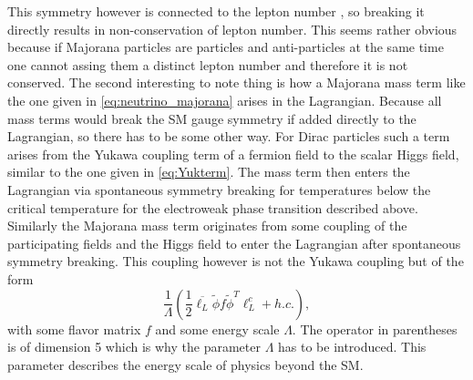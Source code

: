 This symmetry however is connected to the lepton number \cite[p. 14]{Bernreuther:2002uj}, so breaking it directly results in non-conservation of lepton number. This seems rather obvious because if Majorana particles are particles and anti-particles at the same time one cannot assing them a distinct lepton number and therefore it is not conserved. \newline \indent
The second interesting to note thing is how a Majorana mass term like the one given in \eqref{eq:neutrino_majorana} arises in the Lagrangian. Because all mass terms would break the SM gauge symmetry if added directly to the Lagrangian, so there has to be some other way. For Dirac particles such a term arises from the Yukawa coupling term of a fermion field to the scalar Higgs field, similar to the one given in \eqref{eq:Yukterm}. The mass term then enters the Lagrangian via spontaneous symmetry breaking for temperatures below the critical temperature for the electroweak phase transition described above. Similarly the Majorana mass term originates from some coupling of the participating fields and the Higgs field to enter the Lagrangian after spontaneous symmetry breaking. This coupling however is not the Yukawa coupling but of the form \cite[Eq. (5)]{Drewes:2013gca}
\begin{equation}
	\frac{1}{\Lambda}\left(\frac{1}{2}\overline{\ell_L}\tilde{\phi}f\tilde{\phi}^T\ell^c_L+h.c.\right),
\end{equation}
with some flavor matrix $f$ and some energy scale $\Lambda$. The operator in parentheses is of dimension 5 which is why the parameter $\Lambda$ has to be introduced. This parameter describes the energy scale of physics beyond the SM.
